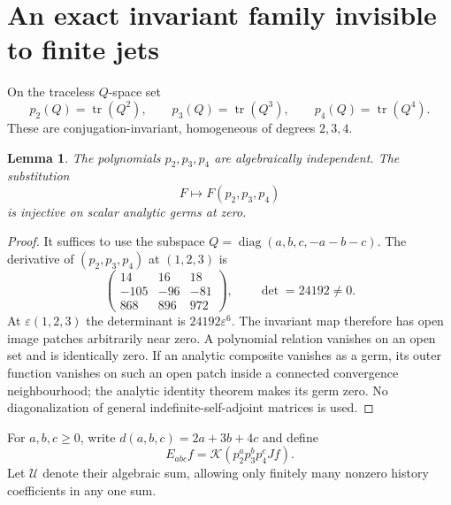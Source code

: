\documentclass[11pt]{article}
\newtheorem{lemma}[theorem]{Lemma}
\theoremstyle{definition}\newtheorem{definition}[theorem]{Definition}
\theoremstyle{remark}\newtheorem{remark}[theorem]{Remark}
\DeclareMathOperator{\tr}{tr}
\DeclareMathOperator{\diag}{diag}
\newcommand{\CK}{\mathcal K}\newcommand{\Jet}{\mathcal J}
\begin{document}
\section{An exact invariant family invisible to finite jets}\label{sec:ambiguity}
On the traceless $Q$-space set
\[
 p_2(Q)=\tr(Q^2),\qquad p_3(Q)=\tr(Q^3),\qquad p_4(Q)=\tr(Q^4).
\]
These are conjugation-invariant, homogeneous of degrees $2,3,4$.

\begin{lemma}\label{lem:independent}
The polynomials $p_2,p_3,p_4$ are algebraically independent. The substitution
\[F\longmapsto F(p_2,p_3,p_4)\]
is injective on scalar analytic germs at zero.
\end{lemma}
\begin{proof}
It suffices to use the subspace $Q=\diag(a,b,c,-a-b-c)$. The derivative of $(p_2,p_3,p_4)$ at $(1,2,3)$ is
\[
 \begin{pmatrix}14&16&18\\-105&-96&-81\\868&896&972\end{pmatrix},
 \qquad \det=24192\ne0.
\]
At $\varepsilon(1,2,3)$ the determinant is $24192\varepsilon^6$. The invariant map therefore has open image patches arbitrarily near zero. A polynomial relation vanishes on an open set and is identically zero. If an analytic composite vanishes as a germ, its outer function vanishes on such an open patch inside a connected convergence neighbourhood; the analytic identity theorem makes its germ zero. No diagonalization of general indefinite-self-adjoint matrices is used.
\end{proof}

For $a,b,c\ge0$, write $d(a,b,c)=2a+3b+4c$ and define
\[
 E_{abc}f=\CK(p_2^ap_3^bp_4^cJf).
\]
Let $\mathcal U$ denote their algebraic sum, allowing only finitely many nonzero history coefficients in any one sum.
\end{document}

